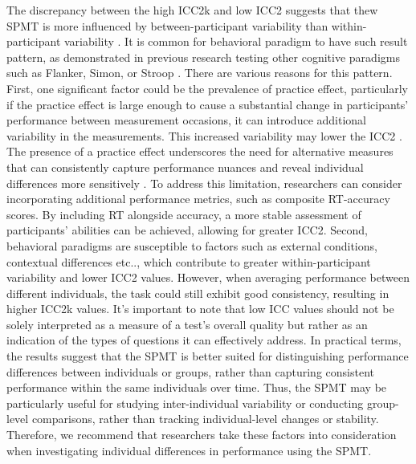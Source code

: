\documentclass[sn-apa]{sn-jnl}%
\theoremstyle{thmstyleone}%
\theoremstyle{thmstyletwo}%
\theoremstyle{thmstylethree}%
\begin{document}
The discrepancy between the high ICC2k and low ICC2 suggests that thew SPMT is more influenced by between-participant variability than within-participant variability \parencite{hedge2018reliability,liljequist2019intraclass}. It is common for behavioral paradigm to have such result pattern, as demonstrated in previous research testing other cognitive paradigms such as Flanker, Simon, or Stroop \parencite{clark2022test,mollon2017individual}. There are various reasons for this pattern. First, one significant factor could be the prevalence of practice effect, particularly if the practice effect is large enough to cause a substantial change in participants' performance between measurement occasions, it can introduce additional variability in the measurements. This increased variability may lower the ICC2 \parencite{oswald2015development,siegelman2017measuring}. The presence of a practice effect underscores the need for alternative measures that can consistently capture performance nuances and reveal individual differences more sensitively \parencite{hedge2018reliability}. To address this limitation, researchers can consider incorporating additional performance metrics, such as composite RT-accuracy scores. By including RT alongside accuracy, a more stable  assessment of participants' abilities can be achieved, allowing for greater ICC2. Second, behavioral paradigms are susceptible to factors such as external conditions, contextual differences etc.., which contribute to greater within-participant variability and lower ICC2 values. However, when averaging performance between different individuals, the task could still exhibit good consistency, resulting in higher ICC2k values. It's important to note that low ICC values should not be solely interpreted as a measure of a test's overall quality but rather as an indication of the types of questions it can effectively address. In practical terms, the results suggest that the SPMT is better suited for distinguishing performance differences between individuals or groups, rather than capturing consistent performance within the same individuals over time. Thus, the SPMT may be particularly useful for studying inter-individual variability or conducting group-level comparisons, rather than tracking individual-level changes or stability. Therefore, we recommend that researchers take these factors into consideration when investigating individual differences in performance using the SPMT.
\end{document}
